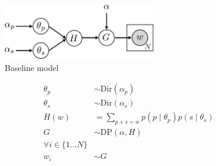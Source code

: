 \begin{figure}[h]
  \centering
  \includegraphics[width=0.6\textwidth]{fig/v1}
  \caption{Baseline model}
  \label{fig:v1}
\end{figure}

\begin{align*}
  \theta_p & \sim \text{Dir}(\alpha_p) \\
  \theta_s & \sim \text{Dir}(\alpha_s) \\
  H(w) & = \sum_{p+s=w} p(p \mid \theta_p) p(s \mid \theta_s) \\
  G & \sim \text{DP}(\alpha, H) \\
  \forall i \in \{1 \dots N\} \\
  w_i & \sim G
\end{align*}
